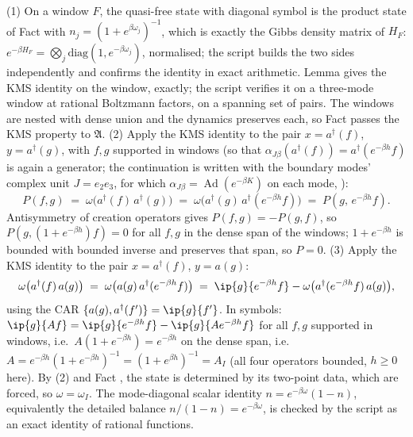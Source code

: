 (1) On a window $F$, the quasi-free state with diagonal symbol is the product state of Fact  with $n_j = (1 + e^{\beta\omega_j})^{-1}$, which is exactly the Gibbs density matrix of $H_F$: $e^{-\beta H_F} = \bigotimes_j \mathrm{diag}(1, e^{-\beta\omega_j})$, normalised; the script builds the two sides independently and confirms the identity in exact arithmetic. Lemma  gives the KMS identity on the window, exactly; the script verifies it on a three-mode window at rational Boltzmann factors, on a spanning set of pairs. The windows are nested with dense union and the dynamics preserves each, so Fact  passes the KMS property to $\mathfrak{A}$.
(2) Apply the KMS identity to the pair $x = a^\dagger(f)$, $y = a^\dagger(g)$, with $f, g$ supported in windows (so that $\alpha_{J\beta}(a^\dagger(f)) = a^\dagger(e^{-\beta h}f)$ is again a generator; the continuation is written with the boundary modes' complex unit $J = e_{2}e_{3}$, for which $\alpha_{J\beta} = \operatorname{Ad}(e^{-\beta K})$ on each mode, ):
\[
P(f, g) \;=\; \omega\bigl(a^\dagger(f)\,a^\dagger(g)\bigr) \;=\; \omega\bigl(a^\dagger(g)\,a^\dagger(e^{-\beta h}f)\bigr) \;=\; P(g,\, e^{-\beta h}f).
\]
Antisymmetry of creation operators gives $P(f, g) = -P(g, f)$, so $P(g, (1 + e^{-\beta h})f) = 0$ for all $f, g$ in the dense span of the windows; $1 + e^{-\beta h}$ is bounded with bounded inverse and preserves that span, so $P = 0$.
(3) Apply the KMS identity to the pair $x = a^\dagger(f)$, $y = a(g)$:
\[
\omega\bigl(a^\dagger(f)\,a(g)\bigr) \;=\; \omega\bigl(a(g)\,a^\dagger(e^{-\beta h}f)\bigr)
\;=\; \ip{g}{e^{-\beta h}f} - \omega\bigl(a^\dagger(e^{-\beta h}f)\,a(g)\bigr),
\]
using the CAR $\{a(g), a^\dagger(f')\} = \ip{g}{f'}$. In symbols: $\ip{g}{Af} = \ip{g}{e^{-\beta h}f} - \ip{g}{Ae^{-\beta h}f}$ for all $f, g$ supported in windows, i.e.\ $A(1 + e^{-\beta h}) = e^{-\beta h}$ on the dense span, i.e.\ $A = e^{-\beta h}(1+e^{-\beta h})^{-1} = (1 + e^{\beta h})^{-1} = A_I$ (all four operators bounded, $h \ge 0$ here). By (2) and Fact , the state is determined by its two-point data, which are forced, so $\omega = \omega_I$. The mode-diagonal scalar identity $n = e^{-\beta\omega}(1-n)$, equivalently the detailed balance $n/(1-n) = e^{-\beta\omega}$, is checked by the script as an exact identity of rational functions.
